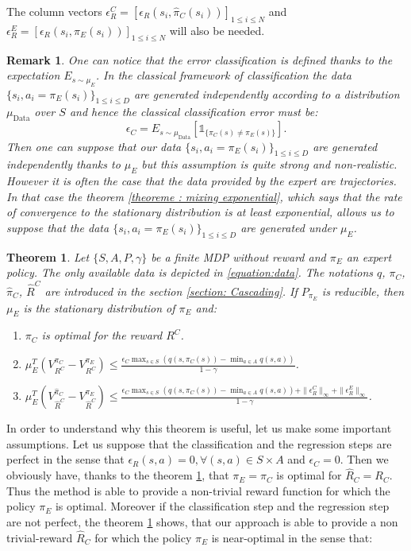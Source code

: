 \documentclass{article} %
\newtheorem{theorem}{Theorem}
\newtheorem{remark}{Remark}
\newcommand{\0}{\mathbf{0}}
\newcommand{\1}{\mathbf{1}}
\begin{document}
The column vectors $\epsilon^C_R=[\epsilon_R(s_i,\hat{\pi}_C(s_i))]_{1\leq i \leq N}$ and $\epsilon^E_R=[\epsilon_R(s_i,\pi_E(s_i))]_{1\leq i \leq N}$ will also be needed.
\begin{remark}
One can notice that the error classification is defined thanks to the expectation $E_{s \sim \mu_E}$. In the classical framework of classification the data $\{s_i,a_i=\pi_E(s_i)\}_{1\leq i \leq D}$
are generated independently according to a distribution $\mu_{\text{Data}}$ over $S$ and hence the classical classification error must be:
\begin{equation}
\epsilon_C=E_{s \sim \mu_{\text{Data}}}[\mathds{1}_{\{\pi_C(s)\neq\pi_E(s)\}}].
\end{equation}
Then one can suppose that our data $\{s_i,a_i=\pi_E(s_i)\}_{1\leq i \leq D}$ are generated independently thanks to $\mu_E$ but this assumption is quite strong and non-realistic.
However it is often the case that the data provided by the expert are trajectories. In that case the theorem \ref{theoreme : mixing exponential}, which says that the rate of convergence
to the stationary distribution is at least exponential, allows us to suppose that the data $\{s_i,a_i=\pi_E(s_i)\}_{1\leq i \leq D}$ are generated under $\mu_E$.
\end{remark}
\begin{theorem}
\label{theorem : results}
Let $\{S,A,P,\gamma\}$ be a finite MDP without reward and $\pi_E$ an expert policy. The only available data is depicted in \eqref{equation:data}.
The notations $q$, $\pi_C$, $\hat{\pi}_C$, $\hat{R}^C$ are introduced in the section \ref{section: Cascading}.
If $P_{\pi_E}$ is reducible, then $\mu_E$ is the stationary distribution of $\pi_E$ and:
\begin{enumerate}
\item $\pi_C$ is optimal for the reward $R^C$.
\item $\mu_E^T(V^{\pi_C}_{R^C}-V^{\pi_E}_{R^C})\leq\frac{\epsilon_C\max_{s\in S}(q(s,\pi_C(s))-\min_{a\in A}q(s,a))}{1-\gamma}$.
\item $\mu_E^T(V^{\hat{\pi}_C}_{\hat{R}^C}-V^{\pi_E}_{\hat{R}^C})\leq \frac{\epsilon_C\max_{s\in S}(q(s,\pi_C(s))-\min_{a\in A}q(s,a))+\|\epsilon^C_R\|_{\infty}+\|\epsilon^E_R\|_{\infty}}{1-\gamma}$.
\end{enumerate}
\end{theorem}
In order to understand why this theorem is useful, let us make some important assumptions. Let us suppose that the classification and the regression steps are perfect in the sense that $\epsilon_R(s,a)=0,\forall (s,a)\in S\times A$ and $\epsilon_C=0$. Then we obviously have, thanks to the theorem \ref{theorem : results}, that $\pi_E=\pi_C$ is optimal for $\hat{R}_C=R_C$. Thus the method is able to provide a non-trivial reward function for which the policy $\pi_E$ is optimal. Moreover if the classification step and the regression step are not perfect, the theorem \ref{theorem : results} shows, that our approach is able to provide a non trivial-reward $\hat{R}_C$ for which the policy $\pi_E$ is near-optimal in the sense that:
\end{document}

